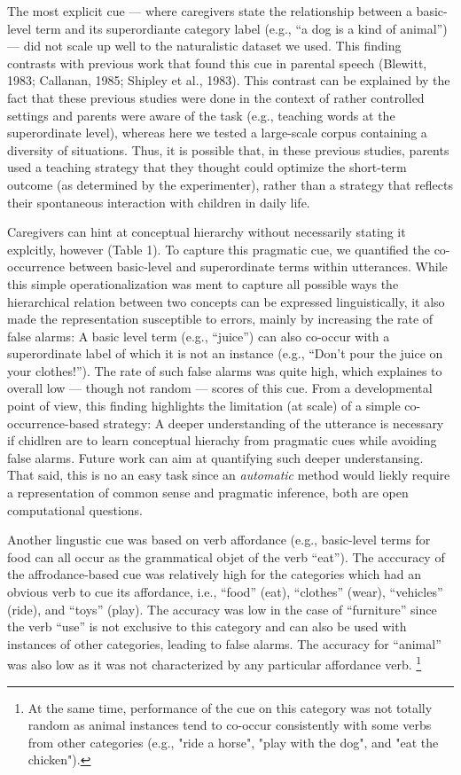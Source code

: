 \documentclass[english,,man,floatsintext]{apa6}
\begin{document}
The most explicit cue --- where caregivers state the relationship between a basic-level term and its superordiante category label (e.g., \enquote{a dog is a kind of animal}) --- did not scale up well to the naturalistic dataset we used. This finding contrasts with previous work that found this cue in parental speech (Blewitt, 1983; Callanan, 1985; Shipley et al., 1983). This contrast can be explained by the fact that these previous studies were done in the context of rather controlled settings and parents were aware of the task (e.g., teaching words at the superordinate level), whereas here we tested a large-scale corpus containing a diversity of situations. Thus, it is possible that, in these previous studies, parents used a teaching strategy that they thought could optimize the short-term outcome (as determined by the experimenter), rather than a strategy that reflects their spontaneous interaction with children in daily life.

Caregivers can hint at conceptual hierarchy without necessarily stating it explcitly, however (Table 1). To capture this pragmatic cue, we quantified the co-occurrence between basic-level and superordinate terms within utterances. While this simple operationalization was ment to capture all possible ways the hierarchical relation between two concepts can be expressed linguistically, it also made the representation susceptible to errors, mainly by increasing the rate of false alarms: A basic level term (e.g., \enquote{juice}) can also co-occur with a superordinate label of which it is not an instance (e.g., \enquote{Don't pour the juice on your clothes!}). The rate of such false alarms was quite high, which explaines to overall low --- though not random --- scores of this cue. From a developmental point of view, this finding highlights the limitation (at scale) of a simple co-occurrence-based strategy: A deeper understanding of the utterance is necessary if chidlren are to learn conceptual hierachy from pragmatic cues while avoiding false alarms. Future work can aim at quantifying such deeper understansing. That said, this is no an easy task since an \emph{automatic} method would liekly require a representation of common sense and pragmatic inference, both are open computational questions.

Another lingustic cue was based on verb affordance (e.g., basic-level terms for food can all occur as the grammatical objet of the verb \enquote{eat}). The acccuracy of the affrodance-based cue was relatively high for the categories which had an obvious verb to cue its affordance, i.e., \enquote{food} (eat), \enquote{clothes} (wear), \enquote{vehicles} (ride), and \enquote{toys} (play). The accuracy was low in the case of \enquote{furniture} since the verb \enquote{use} is not exclusive to this category and can also be used with instances of other categories, leading to false alarms. The accuracy for
\enquote{animal} was also low as it was not characterized by any particular affordance verb. \footnote{At the same time, performance of the cue on this category was not totally random as animal instances tend to co-occur consistently with some verbs from other categories (e.g., "ride a horse", "play with the dog", and "eat the chicken").}
\end{document}
